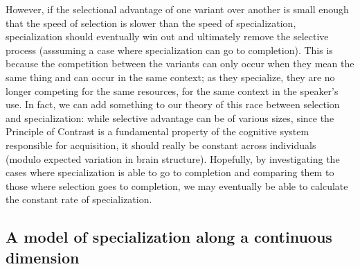 


However, if the selectional advantage of one variant over another is small enough that the speed of selection is slower than the speed of specialization, specialization should eventually win out and ultimately remove the selective process (asssuming a case where specialization can go to completion).
This is because the competition between the variants can only occur when they mean the same thing and can occur in the same context; as they specialize, they are no longer competing for the same resources, for the same context in the speaker's use.
In fact, we can add something to our theory of this race between selection and specialization: while selective advantage can be of various sizes, since the Principle of Contrast is a fundamental property of the cognitive system responsible for acquisition, it should really be constant across individuals (modulo expected variation in brain structure).
Hopefully, by investigating the cases where specialization is able to go to completion and comparing them to those where selection goes to completion, we may eventually be able to calculate the constant rate of specialization.


\subsection{A model of specialization along a continuous dimension}

